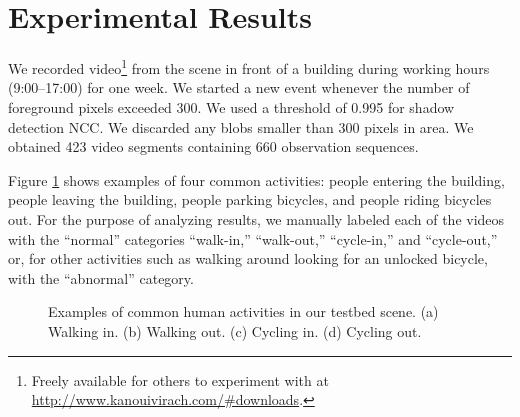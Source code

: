 \section{Experimental Results}
\label{incremental-results}

We recorded video\footnote{Freely available for others to experiment 
with at \url{http://www.kanouivirach.com/#downloads}.}
from the scene in front of a building during working hours
(9:00--17:00) for one week.  We started a new event whenever the
number of foreground pixels exceeded 300.  We used a threshold of
0.995 for shadow detection NCC.  We discarded any blobs smaller than
300 pixels in area. We obtained 423 video segments containing 660
observation sequences.

Figure \ref{fig:example-behavior} shows examples of four common
activities: people entering the building, people leaving the building,
people parking bicycles, and people riding bicycles out. For the
purpose of analyzing results, we manually labeled each of the videos
with the ``normal'' categories ``walk-in,'' ``walk-out,''
``cycle-in,'' and ``cycle-out,'' or, for other activities such as
walking around looking for an unlocked bicycle, with the ``abnormal''
category.

\begin{figure}[t]
  \centering
  \hspace{0.05in}
  \hspace{0.05in}
  \hspace{0.05in}
  \caption[Examples of common human activities in our testbed
    scene.]{\small Examples of common human activities in our testbed
    scene.  (a) Walking in. (b) Walking out. (c) Cycling in. (d)
    Cycling out.}
  \label{fig:example-behavior}
\end{figure}


